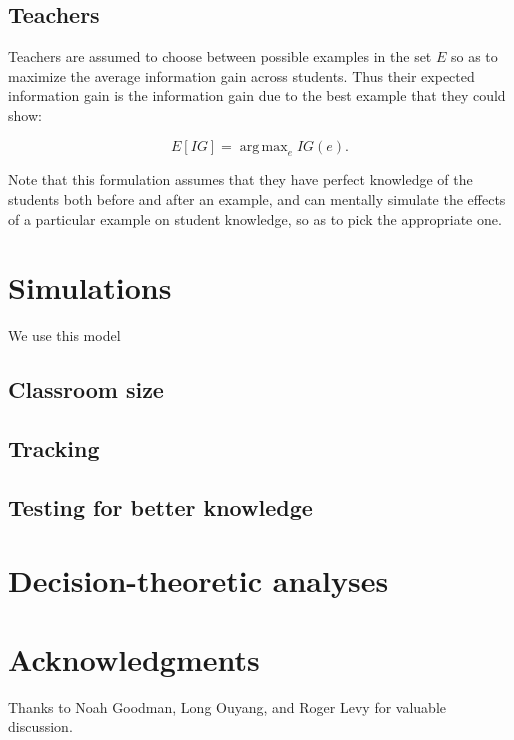 \documentclass[10pt,letterpaper]{article}
\DeclareMathOperator*{\argmax}{arg\,max}
\begin{document}
\subsection{Teachers}

Teachers are assumed to choose between possible examples in the set $E$ so as to maximize the average information gain across students. Thus their expected information gain is the information gain due to the best example that they could show:

\begin{equation}
E[IG] = \argmax_e {IG(e)}.
\end{equation}

Note that this formulation assumes that they have perfect knowledge of the students both before and after an example, and can mentally simulate the effects of a particular example on student knowledge, so as to pick the appropriate one. 

\section{Simulations}

We use this model 

\subsection{Classroom size}

\subsection{Tracking}

\subsection{Testing for better knowledge}

\section{Decision-theoretic analyses}


\section{Acknowledgments}

Thanks to Noah Goodman, Long Ouyang, and Roger Levy for valuable discussion.



\setlength{\bibleftmargin}{.125in}
\setlength{\bibindent}{-\bibleftmargin}


\end{document}
